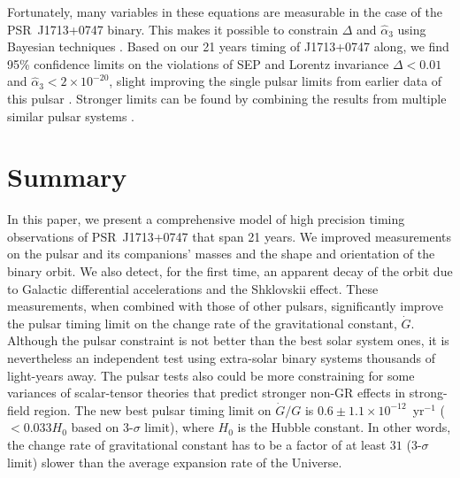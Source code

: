 Fortunately, many variables in these equations are measurable in the
case of the PSR~J1713+0747 binary. This makes it possible to constrain $\Delta$
and $\hat{\alpha}_3$ using Bayesian techniques 
\citep{sns+05, sfl+05, gsf+11}. Based on our 21 years 
timing of J1713+0747 along, we find 95\% confidence limits on the violations of SEP and
Lorentz invariance $\Delta < 0.01$ and $\hat{\alpha}_3<2\times10^{-20}$, 
slight improving the single pulsar limits from earlier data of this pulsar \citep{sfl+05, gsf+11}.
Stronger limits can be found by combining the results from
multiple similar pulsar systems \citep{wex00,sfl+05, gsf+11}.


\section{Summary}
In this paper, we present a comprehensive model of high precision timing observations of
PSR~J1713+0747 that span 21 years. 
We improved measurements on the pulsar and its companions' masses and the
shape and orientation of the binary orbit. We also detect, for the first time, an apparent
decay of the orbit due to Galactic differential accelerations and the Shklovskii effect.
These measurements, when combined with those of other pulsars, 
significantly improve the pulsar timing limit on the change rate of the gravitational
constant, $\dot{G}$. Although the pulsar constraint is not better than the
best solar system ones, it is nevertheless an independent test using 
extra-solar binary systems thousands of light-years away. The pulsar tests
also could be more constraining for some
variances of scalar-tensor theories that predict stronger non-GR effects in strong-field region.
The new best pulsar timing limit on $\dot{G}/G$ is 
$0.6\pm1.1\times10^{-12}$~yr$^{-1}$ ($<0.033H_0$ based on 3-$\sigma$ limit), where $H_0$ is the Hubble constant. 
In other words, the change rate of gravitational constant has to be a factor
of at least $31$ (3-$\sigma$ limit) slower than the average expansion rate of
the Universe.

